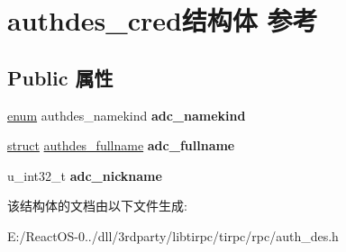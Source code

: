 \hypertarget{structauthdes__cred}{}\section{authdes\+\_\+cred结构体 参考}
\label{structauthdes__cred}
\subsection*{Public 属性}
\begin{DoxyCompactItemize}
\item 
\mbox{\label{structauthdes__cred_aed0a3e37e902b8b9f8aab50a86608cd8}} 
\hyperlink{interfaceenum}{enum} authdes\+\_\+namekind {\bfseries adc\+\_\+namekind}
\item 
\mbox{\label{structauthdes__cred_ae024fd664d1291c369e3006455d52f26}} 
\hyperlink{interfacestruct}{struct} \hyperlink{structauthdes__fullname}{authdes\+\_\+fullname} {\bfseries adc\+\_\+fullname}
\item 
\mbox{\label{structauthdes__cred_a593c66bd1b27d8abe77b6963c12ef908}} 
u\+\_\+int32\+\_\+t {\bfseries adc\+\_\+nickname}
\end{DoxyCompactItemize}


该结构体的文档由以下文件生成\+:\begin{DoxyCompactItemize}
\item 
E\+:/\+React\+O\+S-\/0../dll/3rdparty/libtirpc/tirpc/rpc/auth\+\_\+des.\+h\end{DoxyCompactItemize}
